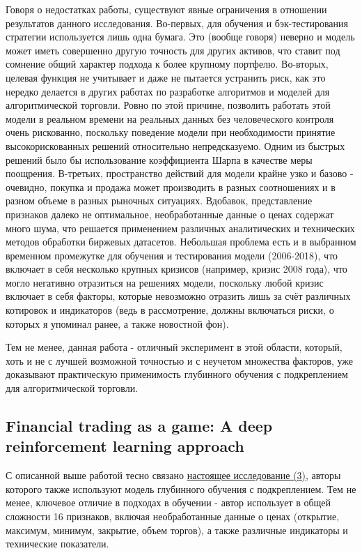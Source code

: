 \documentclass[a4paper,14pt]{extarticle}
\newcommand{\bibref}[3]{\hyperlink{#1}{#2 (#3)}} %
\begin{document}
Говоря о недостатках работы, существуют явные ограничения в отношении результатов данного исследования. Во-первых, для обучения и бэк-тестирования стратегии используется лишь одна бумага. Это (вообще говоря) неверно и модель может иметь совершенно другую точность для других активов, что ставит под сомнение общий характер подхода к более крупному портфелю. Во-вторых, целевая функция не учитывает и даже не пытается устранить риск, как это нередко делается в других работах по разработке алгоритмов и моделей для алгоритмической торговли. Ровно по этой причине, позволить работать этой модели в реальном времени на реальных данных без человеческого контроля очень рискованно, поскольку поведение модели при необходимости принятие высокорискованных решений относительно непредсказуемо. Одним из быстрых решений было бы использование коэффициента Шарпа в качестве меры поощрения. В-третьих, пространство действий для модели крайне узко и базово - очевидно, покупка и продажа может производить в разных соотношениях и в разном объеме в разных рыночных ситуациях. Вдобавок, представление признаков далеко не оптимальное, необработанные данные о ценах содержат много шума, что решается применением различных аналитических и технических методов обработки биржевых датасетов. Небольшая проблема есть и в выбранном временном промежутке для обучения и тестирования модели (2006-2018), что включает в себя несколько крупных кризисов (например, кризис 2008 года), что могло негативно отразиться на решениях модели, поскольку любой кризис включает в себя факторы, которые невозможно отразить лишь за счёт различных котировок и индикаторов (ведь в рассмотрение, должны включаться риски, о которых я упоминал ранее, а также новостной фон).

Тем не менее, данная работа - отличный эксперимент в этой области, который, хоть и не с лучшей возможной точностью и с неучетом множества факторов, уже доказывают практическую применимость глубинного обучения с подкреплением для алгоритмической торговли.

\subsection{Financial trading as a game: A deep reinforcement learning approach}

С описанной выше работой тесно связано \bibref{3}{настоящее исследование}{3}, авторы которого также используют модель глубинного обучения с подкреплением. Тем не менее, ключевое отличие в подходах в обучении - автор использует в общей сложности 16 признаков, включая необработанные данные о ценах (открытие, максимум, минимум, закрытие, объем торгов), а также различные индикаторы и технические показатели.
\end{document}
